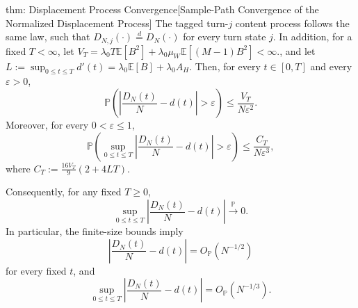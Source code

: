 \documentclass{article}
\theoremstyle{definition}
\newcommand{\E}{\mathbb E}
\newcommand{\pro}{\mathbb P}
\begin{document}
\begin{reptheorem}{thm: Displacement Process Convergence}[Sample-Path Convergence of the Normalized Displacement Process]
    The tagged turn-$j$ content process follows the same law, such that $D_{N,j}(\cdot)\overset{d}{=}D_N(\cdot)$ for every turn state $j$. In addition, for a fixed $T<\infty$, let $V_T  = \lambda_0T\E[B^2]+\lambda_0\mu_W\E[(M-1)B^2]<\infty.$, and let $L :=\sup_{0\leq t\leq T}d'(t)=\lambda_0\E[B]+\lambda_0A_H$.
    Then, for every $t\in[0,T]$ and every $\varepsilon>0$,
    \begin{equation*}
        \pro\left(\left|\frac{D_N(t)}{N}-d(t)\right|>\varepsilon\right)\leq\frac{V_T}{N\varepsilon^2}.
    \end{equation*}
    Moreover, for every $0<\varepsilon\leq1$,
    \begin{equation*}
        \pro\left(\sup_{0\leq t\leq T}\left|\frac{D_N(t)}{N}-d(t)\right|>\varepsilon\right)\leq\frac{C_T}{N\varepsilon^3},
    \end{equation*}
    where $C_T:=\frac{16V_T}{9}(2+4 L T).$
    
    Consequently, for any fixed $T\geq 0$,
    \begin{equation*}
        \sup_{0\leq t\leq T}\left|\frac{D_N(t)}{N}-d(t)\right|\xrightarrow{\mathbb P}0.
    \end{equation*}
    In particular, the finite-size bounds imply
    \begin{equation*}
        \left|\frac{D_N(t)}{N}-d(t)\right|=O_{\mathbb P}(N^{-1/2})
    \end{equation*}
    for every fixed $t$, and
    \begin{equation*}
        \sup_{0\leq t\leq T}\left|\frac{D_N(t)}{N}-d(t)\right|=O_{\mathbb P}(N^{-1/3}).
    \end{equation*}
\end{reptheorem}
\end{document}
